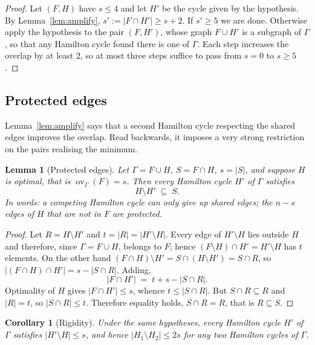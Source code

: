 \documentclass[11pt,a4paper]{article}
\newtheorem{lemma}[theorem]{Lemma}
\newtheorem{corollary}[theorem]{Corollary}
\theoremstyle{definition}
\theoremstyle{remark}
\newcommand{\ov}{\operatorname{ov}}
\begin{document}
\begin{proof}
Let $(F,H)$ have $s\le4$ and let $H'$ be the cycle given by the hypothesis. By Lemma~\ref{lem:amplify}, $s':=|F\cap H'|\ge s+2$. If $s'\ge5$ we are done. Otherwise apply the hypothesis to the pair $(F,H')$, whose graph $F\cup H'$ is a subgraph of $\Gamma$, so that any Hamilton cycle found there is one of $\Gamma$. Each step increases the overlap by at least $2$, so at most three steps suffice to pass from $s=0$ to $s\ge5$.
\end{proof}

\subsection{Protected edges}

Lemma~\ref{lem:amplify} says that a second Hamilton cycle respecting the shared edges improves the overlap. Read backwards, it imposes a very strong restriction on the pairs realising the minimum.

\begin{lemma}[Protected edges]\label{lem:protected}
Let $\Gamma=F\cup H$, $S=F\cap H$, $s=|S|$, and suppose $H$ is optimal, that is $\ov_\Gamma(F)=s$. Then every Hamilton cycle $H'$ of $\Gamma$ satisfies
\[
H\setminus H'\;\subseteq\;S .
\]
In words: a competing Hamilton cycle can only give up \emph{shared} edges; the $n-s$ edges of $H$ that are not in $F$ are protected.
\end{lemma}

\begin{proof}
Let $R=H\setminus H'$ and $t=|R|=|H'\setminus H|$. Every edge of $H'\setminus H$ lies outside $H$ and therefore, since $\Gamma=F\cup H$, belongs to $F$; hence $(F\setminus H)\cap H'=H'\setminus H$ has $t$ elements. On the other hand $(F\cap H)\setminus H'=S\cap(H\setminus H')=S\cap R$, so $|(F\cap H)\cap H'|=s-|S\cap R|$. Adding,
\[
|F\cap H'|\;=\;t+s-|S\cap R| .
\]
Optimality of $H$ gives $|F\cap H'|\le s$, whence $t\le|S\cap R|$. But $S\cap R\subseteq R$ and $|R|=t$, so $|S\cap R|\le t$. Therefore equality holds, $S\cap R=R$, that is $R\subseteq S$.
\end{proof}

\begin{corollary}[Rigidity]\label{cor:rigid}
Under the same hypotheses, every Hamilton cycle $H'$ of $\Gamma$ satisfies $|H'\setminus H|\le s$, and hence $|H_1\setminus H_2|\le2s$ for any two Hamilton cycles of $\Gamma$.
\end{corollary}
\end{document}
